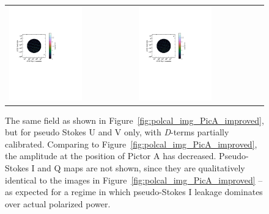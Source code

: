 \begin{figure}
\hspace{-2cm}\begin{tabular}{ll}
\includegraphics[clip, trim=0.1cm 11cm 6cm 6cm, width=0.6\textwidth]{chapters/polcal/figures/68380-U-improved-xdel.pdf} &
\includegraphics[clip, trim=0.1cm 11cm 6cm 6cm, width=0.6\textwidth]{chapters/polcal/figures/68380-V-improved-xdel.pdf} \\
\end{tabular}
\caption[The same field as shown in Figure~\ref{fig:polcal_img_PicA_improved}, but for pseudo Stokes U and V only, with \textit{D}-terms partially calibrated.]{The same field as shown in Figure~\ref{fig:polcal_img_PicA_improved}, but for pseudo Stokes U and V only, with \textit{D}-terms partially calibrated. Comparing to Figure~\ref{fig:polcal_img_PicA_improved}, the amplitude at the position of Pictor A has decreased. Pseudo-Stokes I and Q maps are not shown, since they are qualitatively identical to the images in Figure~\ref{fig:polcal_img_PicA_improved} -- as expected for a regime in which pseudo-Stokes I leakage dominates over actual polarized power.}
\label{fig:polcal_img_PicA_improved_dterm}
\end{figure}



